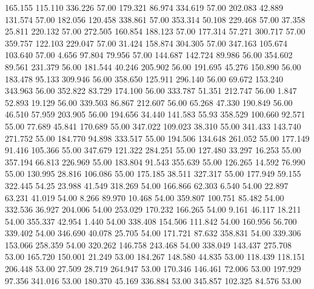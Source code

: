  165.155  115.110  336.226        57.00
 179.321   86.974  334.619        57.00
 202.083   42.889  131.574        57.00
 182.056  120.458  338.861        57.00
 353.314   50.108  229.468        57.00
  37.358   25.811  220.132        57.00
 272.505  160.854  188.123        57.00
 177.314   57.271  300.717        57.00
 359.757  122.103  229.047        57.00
  31.424  158.874  304.305        57.00
 347.163  105.674  103.640        57.00
   4.656   97.804   79.956        57.00
 144.687  142.724   89.986        56.00
 354.602   89.561  231.379        56.00
 181.544   40.246  205.902        56.00
 191.695   45.276  150.890        56.00
 183.478   95.133  309.946        56.00
 358.650  125.911  296.140        56.00
  69.672  153.240  343.963        56.00
 352.822   83.729  174.100        56.00
 333.787   51.351  212.747        56.00
   1.847   52.893   19.129        56.00
 339.503   86.867  212.607        56.00
  65.268   47.330  190.849        56.00
  46.510   57.959  203.905        56.00
 194.656   34.440  141.583        55.93
 358.529  100.660   92.571        55.00
  77.689   45.841  170.689        55.00
 347.022  109.023   38.310        55.00
 341.433  143.740  271.752        55.00
 184.770   94.898  333.517        55.00
 194.506  134.648  261.052        55.00
 177.149   91.416  105.366        55.00
 347.679  121.322  284.251        55.00
 127.480   33.297   16.253        55.00
 357.194   66.813  226.969        55.00
 183.804   91.543  355.639        55.00
 126.265   14.592   76.990        55.00
 130.995   28.816  106.086        55.00
 175.185   38.511  327.317        55.00
 177.949   59.155  322.445        54.25
  23.988   41.549  318.269        54.00
 166.866   62.303    6.540        54.00
  22.897   63.231   41.019        54.00
   8.266   89.970   10.468        54.00
 359.807  100.751   85.482        54.00
 332.536   36.927  204.006        54.00
 253.029  170.232  166.265        54.00
   9.161   46.117   18.211        54.00
 355.337   42.954    1.440        54.00
 338.408  154.506  111.842        54.00
 160.956   56.700  339.402        54.00
 346.690   40.078   25.705        54.00
 171.721   87.632  358.831        54.00
 339.306  153.066  258.359        54.00
 320.262  146.758  243.468        54.00
 338.049  143.437  275.708        53.00
 165.720  150.001   21.249        53.00
 184.267  148.580   44.835        53.00
 118.439  118.151  206.448        53.00
  27.509   28.719  264.947        53.00
 170.346  146.461   72.006        53.00
 197.929   97.356  341.016        53.00
 180.370   45.169  336.884        53.00
 345.857  102.325   84.576        53.00
